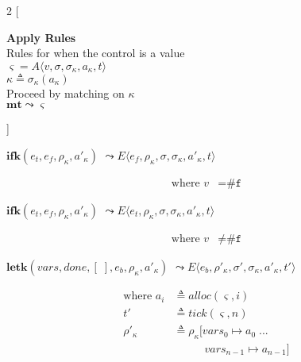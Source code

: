 \documentclass[12pt,draft]{article}
\newcommand{\falsesyn}{\texttt{\#f}}
\begin{document}
\begin{multicols*}{2}
[
\begin{center}
\textbf{Apply Rules} \\
Rules for when the control is a value \\
$\varsigma = A\langle v , \sigma , \sigma_\kappa , a_\kappa , t \rangle$ \\
$\kappa \triangleq \sigma_\kappa(a_\kappa)$ \\
Proceed by matching on $\kappa$ \\
\vspace{5mm}
$\textbf{mt} \leadsto \varsigma$
\end{center}
\vspace{-5mm}
]
\begin{center}
  $\textbf{ifk}(e_t, e_f, \rho_\kappa , a'_\kappa)$
  $\leadsto E\langle e_f , \rho_\kappa , \sigma , \sigma_\kappa , a'_\kappa , t \rangle$
\end{center}
\vspace{-7mm}
\begin{align*}
\text{where } v &= \falsesyn
\end{align*}
\begin{center}
  $\textbf{ifk}(e_t, e_f, \rho_\kappa , a'_\kappa)$
  $\leadsto E\langle e_t , \rho_\kappa , \sigma , \sigma_\kappa , a'_\kappa , t \rangle$
\end{center}
\vspace{-7mm}
\begin{align*}
\text{where } v &\not= \falsesyn
\end{align*}
\begin{center}
  $\textbf{letk}(vars, done, [\;], e_b, \rho_\kappa , a'_\kappa)$
  $\leadsto E\langle e_b , \rho'_\kappa , \sigma' , \sigma_\kappa , a'_\kappa , t' \rangle $
\end{center}
\vspace{-7mm}
\begin{align*}
  \text{where } a_i &\triangleq alloc(\varsigma, i) \\
  t' &\triangleq tick(\varsigma, n) \\
  \rho'_{\kappa} &\triangleq \rho_{\kappa}[vars_0 \mapsto a_0\;...\\
                    &\;\;\;\;\;\;\;\;\;\;  vars_{n-1} \mapsto a_{n-1}] \\

\end{align*}
\end{multicols*}
\end{document}
